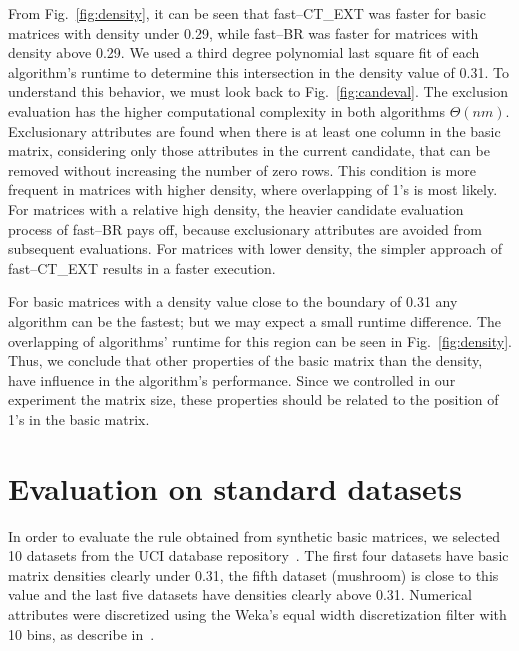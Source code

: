 \documentclass[citenumber]{llncs}
\begin{document}
	From Fig.~\ref{fig:density}, it can be seen that fast--CT\_EXT was faster for basic matrices with density under 0.29, while fast--BR was faster for matrices with density above 0.29. We used a third degree polynomial last square fit of each algorithm's runtime to determine this intersection in the density value of 0.31. To understand this behavior, we must look back to Fig.~\ref{fig:candeval}. The exclusion evaluation has the higher computational complexity in both algorithms $\Theta (nm)$. Exclusionary attributes are found when there is at least one column in the basic matrix, considering only those attributes in the current candidate, that can be removed without increasing the number of zero rows. This condition is more frequent in matrices with higher density, where overlapping of 1's is most likely. For matrices with a relative high density, the heavier candidate evaluation process of fast--BR pays off, because exclusionary attributes are avoided from subsequent evaluations. For matrices with lower density, the simpler approach of fast--CT\_EXT results in a faster execution.
	
	For basic matrices with a density value close to the boundary of 0.31 any algorithm can be the fastest; but we may expect a small runtime difference. The overlapping of algorithms' runtime for this region can be seen in  Fig.~\ref{fig:density}. Thus, we conclude that other properties of the basic matrix than the density, have influence in the algorithm's performance. Since we controlled in our experiment the matrix size, these properties should be related to the position of 1's in the basic matrix.
%
\section{Evaluation on standard datasets} \label{evaluation}
	In order to evaluate the rule obtained from synthetic basic matrices, we selected 10 datasets from the UCI database repository~\cite{Bache13}. The first four datasets have basic matrix densities clearly under 0.31, the fifth dataset  (mushroom) is close to this value and the last five datasets have densities clearly above 0.31. Numerical attributes were discretized using the Weka's equal width discretization filter with 10 bins, as describe in~\cite{Flores2010}.
	
\end{document}
